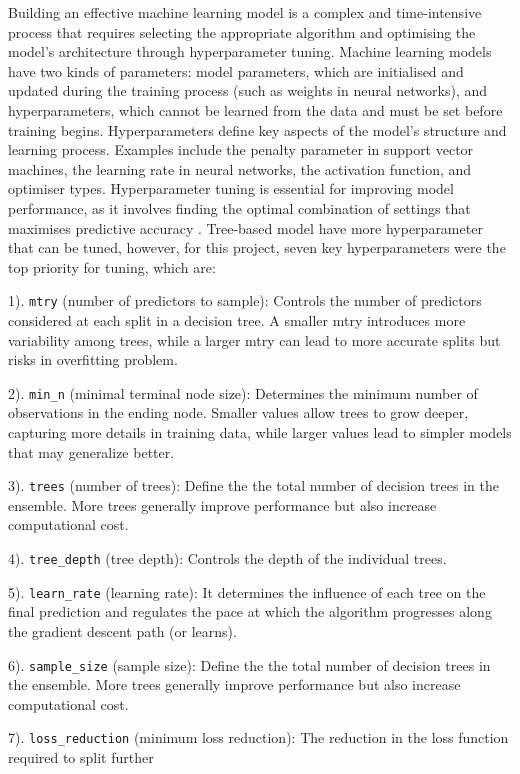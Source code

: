 \documentclass[11pt,a4paper,]{article}
\begin{document}
Building an effective machine learning model is a complex and time-intensive process that requires selecting the appropriate algorithm and optimising the model's architecture through hyperparameter tuning. Machine learning models have two kinds of parameters: model parameters, which are initialised and updated during the training process (such as weights in neural networks), and hyperparameters, which cannot be learned from the data and must be set before training begins. Hyperparameters define key aspects of the model's structure and learning process. Examples include the penalty parameter in support vector machines, the learning rate in neural networks, the activation function, and optimiser types. Hyperparameter tuning is essential for improving model performance, as it involves finding the optimal combination of settings that maximises predictive accuracy \autocite{YANG2020295}. Tree-based model have more hyperparameter that can be tuned, however, for this project, seven key hyperparameters were the top priority for tuning, which are:

1). \texttt{mtry} (number of predictors to sample): Controls the number of predictors considered at each split in a decision tree. A smaller mtry introduces more variability among trees, while a larger mtry can lead to more accurate splits but risks in overfitting problem.

2). \texttt{min\_n} (minimal terminal node size): Determines the minimum number of observations in the ending node. Smaller values allow trees to grow deeper, capturing more details in training data, while larger values lead to simpler models that may generalize better.

3). \texttt{trees} (number of trees): Define the the total number of decision trees in the ensemble. More trees generally improve performance but also increase computational cost.

4). \texttt{tree\_depth} (tree depth): Controls the depth of the individual trees.

5). \texttt{learn\_rate} (learning rate): It determines the influence of each tree on the final prediction and regulates the pace at which the algorithm progresses along the gradient descent path (or learns).

6). \texttt{sample\_size} (sample size): Define the the total number of decision trees in the ensemble. More trees generally improve performance but also increase computational cost.

7). \texttt{loss\_reduction} (minimum loss reduction): The reduction in the loss function required to split further
\end{document}
